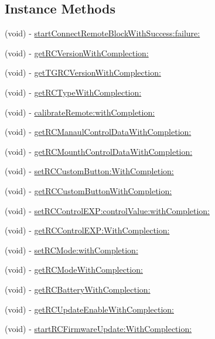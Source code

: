 \subsection*{Instance Methods}
\begin{DoxyCompactItemize}
\item 
(void) -\/ \hyperlink{interface_p_v_remote_controller_a92c7f4e6977d8bca2566f8fd285fd6d2}{start\+Connect\+Remote\+Block\+With\+Success\+:failure\+:}
\item 
(void) -\/ \hyperlink{interface_p_v_remote_controller_a90638bb5e4658fd25ac2606b9e989770}{get\+R\+C\+Version\+With\+Complection\+:}
\item 
(void) -\/ \hyperlink{interface_p_v_remote_controller_a193b392793255c875f8e0cf13bc8e6e1}{get\+T\+G\+R\+C\+Version\+With\+Complection\+:}
\item 
(void) -\/ \hyperlink{interface_p_v_remote_controller_a537c58487b921795637e031cf15d6679}{get\+R\+C\+Type\+With\+Complection\+:}
\item 
(void) -\/ \hyperlink{interface_p_v_remote_controller_a78de735d1a6d9425a2a405a1408dbc07}{calibrate\+Remote\+:with\+Completion\+:}
\item 
(void) -\/ \hyperlink{interface_p_v_remote_controller_acf9aa5c3ed70d98e3c0ee38eeeb3487c}{get\+R\+C\+Manaul\+Control\+Data\+With\+Completion\+:}
\item 
(void) -\/ \hyperlink{interface_p_v_remote_controller_abe3f77888a7bc97198114368993285b2}{get\+R\+C\+Mounth\+Control\+Data\+With\+Completion\+:}
\item 
(void) -\/ \hyperlink{interface_p_v_remote_controller_a551d1bafe340b0a08566c3bbf3300041}{set\+R\+C\+Custom\+Button\+:\+With\+Completion\+:}
\item 
(void) -\/ \hyperlink{interface_p_v_remote_controller_a5e7c79958273d5a1fda6fc46ffac3f15}{get\+R\+C\+Custom\+Button\+With\+Completion\+:}
\item 
(void) -\/ \hyperlink{interface_p_v_remote_controller_ad6ef40ad9fb9954c155ee6a9366f2d1d}{set\+R\+C\+Control\+E\+X\+P\+:control\+Value\+:with\+Completion\+:}
\item 
(void) -\/ \hyperlink{interface_p_v_remote_controller_ae939de42b3f4fbf4fe8f15f589a02d62}{get\+R\+C\+Control\+E\+X\+P\+:\+With\+Complection\+:}
\item 
(void) -\/ \hyperlink{interface_p_v_remote_controller_ab952eb395e4771fe0ff307a02a007536}{set\+R\+C\+Mode\+:with\+Completion\+:}
\item 
(void) -\/ \hyperlink{interface_p_v_remote_controller_a2a64b9e47b1b5899f0ba83c62187b9b7}{get\+R\+C\+Mode\+With\+Complection\+:}
\item 
(void) -\/ \hyperlink{interface_p_v_remote_controller_a0a631aec990e18e524511ba231eb6c9d}{get\+R\+C\+Battery\+With\+Complection\+:}
\item 
(void) -\/ \hyperlink{interface_p_v_remote_controller_afeea774d82453518e33aeae0803ba7e2}{get\+R\+C\+Update\+Enable\+With\+Complection\+:}
\item 
(void) -\/ \hyperlink{interface_p_v_remote_controller_a8850de9fd27227933d2b2b27810667a2}{start\+R\+C\+Firmware\+Update\+:\+With\+Complection\+:}
\end{DoxyCompactItemize}
